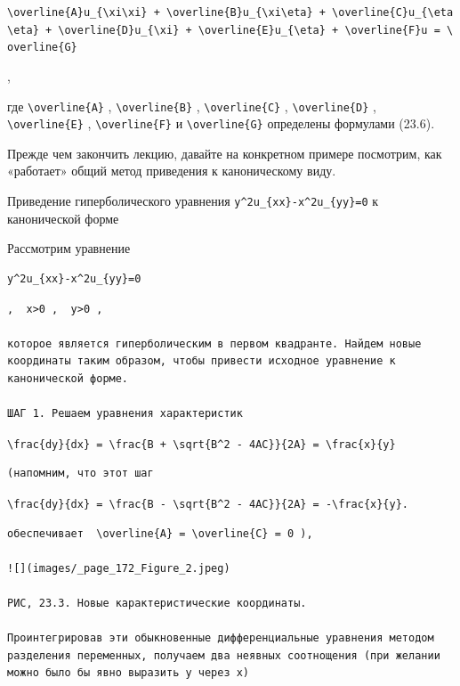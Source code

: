 \documentclass[
  ukrainian,
]{article}
\begin{document}
\texttt{\textbackslash{}overline\{A\}u\_\{\textbackslash{}xi\textbackslash{}xi\}\ +\ \textbackslash{}overline\{B\}u\_\{\textbackslash{}xi\textbackslash{}eta\}\ +\ \textbackslash{}overline\{C\}u\_\{\textbackslash{}eta\textbackslash{}eta\}\ +\ \textbackslash{}overline\{D\}u\_\{\textbackslash{}xi\}\ +\ \textbackslash{}overline\{E\}u\_\{\textbackslash{}eta\}\ +\ \textbackslash{}overline\{F\}u\ =\ \textbackslash{}overline\{G\}}

,

где \texttt{\textbackslash{}overline\{A\}} ,
\texttt{\textbackslash{}overline\{B\}} ,
\texttt{\textbackslash{}overline\{C\}} ,
\texttt{\textbackslash{}overline\{D\}} ,
\texttt{\textbackslash{}overline\{E\}} ,
\texttt{\textbackslash{}overline\{F\}} и
\texttt{\textbackslash{}overline\{G\}} определены формулами (23.6).

Прежде чем закончить лекцию, давайте на конкретном примере посмотрим,
как «работает» общий метод приведения к каноническому виду.

Приведение гиперболического уравнения
\texttt{y\^{}2u\_\{xx\}-x\^{}2u\_\{yy\}=0} к канонической форме

Рассмотрим уравнение

\begin{verbatim}
y^2u_{xx}-x^2u_{yy}=0
\end{verbatim}

\begin{verbatim}
,  x>0 ,  y>0 ,

которое является гиперболическим в первом квадранте. Найдем новые координаты таким образом, чтобы привести исходное уравнение к канонической форме.

ШАГ 1. Решаем уравнения характеристик
\end{verbatim}

\texttt{\textbackslash{}frac\{dy\}\{dx\}\ =\ \textbackslash{}frac\{B\ +\ \textbackslash{}sqrt\{B\^{}2\ -\ 4AC\}\}\{2A\}\ =\ \textbackslash{}frac\{x\}\{y\}}

\begin{verbatim}
(напомним, что этот шаг
\end{verbatim}

\texttt{\textbackslash{}frac\{dy\}\{dx\}\ =\ \textbackslash{}frac\{B\ -\ \textbackslash{}sqrt\{B\^{}2\ -\ 4AC\}\}\{2A\}\ =\ -\textbackslash{}frac\{x\}\{y\}.}

\begin{verbatim}
обеспечивает  \overline{A} = \overline{C} = 0 ),

![](images/_page_172_Figure_2.jpeg)

РИС, 23.3. Новые карактеристические координаты.

Проинтегрировав эти обыкновенные дифференциальные уравнения методом разделения переменных, получаем два неявных соотнощения (при желании можно было бы явно выразить у через х)
\end{verbatim}
\end{document}
